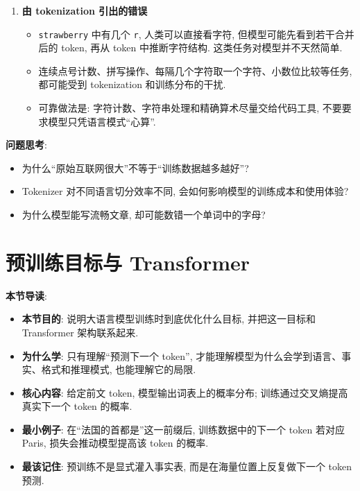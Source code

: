 \documentclass{../nndlcourse}
\begin{document}
\begin{enumerate}
\begin{itemize}
    \end{itemize}
  \item \textbf{由 tokenization 引出的错误}
    \begin{itemize}
      \item \texttt{strawberry} 中有几个 \texttt{r}, 人类可以直接看字符, 但模型可能先看到若干合并后的 token, 再从 token 中推断字符结构. 这类任务对模型并不天然简单.
      \item 连续点号计数、拼写操作、每隔几个字符取一个字符、小数位比较等任务, 都可能受到 tokenization 和训练分布的干扰.
      \item 可靠做法是: 字符计数、字符串处理和精确算术尽量交给代码工具, 不要要求模型只凭语言模式“心算”.
    \end{itemize}
\end{enumerate}

\textbf{问题思考}:
\begin{itemize}
  \item 为什么“原始互联网很大”不等于“训练数据越多越好”?
  \item Tokenizer 对不同语言切分效率不同, 会如何影响模型的训练成本和使用体验?
  \item 为什么模型能写流畅文章, 却可能数错一个单词中的字母?
\end{itemize}

\section{预训练目标与 Transformer}

\textbf{本节导读}:
\begin{itemize}
  \item \textbf{本节目的}: 说明大语言模型训练时到底优化什么目标, 并把这一目标和 Transformer 架构联系起来.
  \item \textbf{为什么学}: 只有理解“预测下一个 token”, 才能理解模型为什么会学到语言、事实、格式和推理模式, 也能理解它的局限.
  \item \textbf{核心内容}: 给定前文 token, 模型输出词表上的概率分布; 训练通过交叉熵提高真实下一个 token 的概率.
  \item \textbf{最小例子}: 在“法国的首都是”这一前缀后, 训练数据中的下一个 token 若对应 Paris, 损失会推动模型提高该 token 的概率.
  \item \textbf{最该记住}: 预训练不是显式灌入事实表, 而是在海量位置上反复做下一个 token 预测.
\end{itemize}
\end{document}
